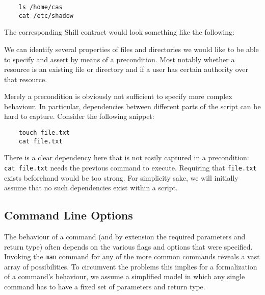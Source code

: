 \documentclass[12pt,a4paper]{article}
\newcommand{\Conid}[1]{\mathit{#1}}
\newcommand{\Varid}[1]{\mathit{#1}}
\def\resethooks{%
  \global\let\SaveRestoreHook\empty
  \global\let\ColumnHook\empty}
\newcommand{\hsindent}[1]{\quad}%
\let\hspre\empty
\let\hspost\empty
\begin{document}
\begin{verbatim}
	ls /home/cas 
	cat /etc/shadow 
\end{verbatim}

The corresponding Shill contract would look something like the following: 

\resethooks

We can identify several properties of files and directories we would like to be able to specify and assert by means of a precondition. Most notably whether a resource is an existing file or directory and if a user has certain authority over that resource. 

Merely a precondition is obviously not sufficient to specify more complex behaviour. In particular, dependencies between different parts of the script can be hard to capture. Consider the following snippet: 

\begin{verbatim}
	touch file.txt 
	cat file.txt
\end{verbatim}

There is a clear dependency here that is not easily captured in a precondition: \texttt{cat file.txt} needs the previous command to execute. Requiring that \texttt{file.txt} exists beforehand would be too strong. For simplicity sake, we will initially assume that no such dependencies exist within a script. 

\subsection{Command Line Options}
The behaviour of a command (and by extension the required parameters and return type) often depends on the various flags and options that were specified. Invoking the \texttt{man} command for any of the more common commands reveals a vast array of possibilities. To circumvent the problems this implies for a formalization of a command's behaviour, we assume a simplified model in which any single command has to have a fixed set of parameters and return type. 
\end{document}
